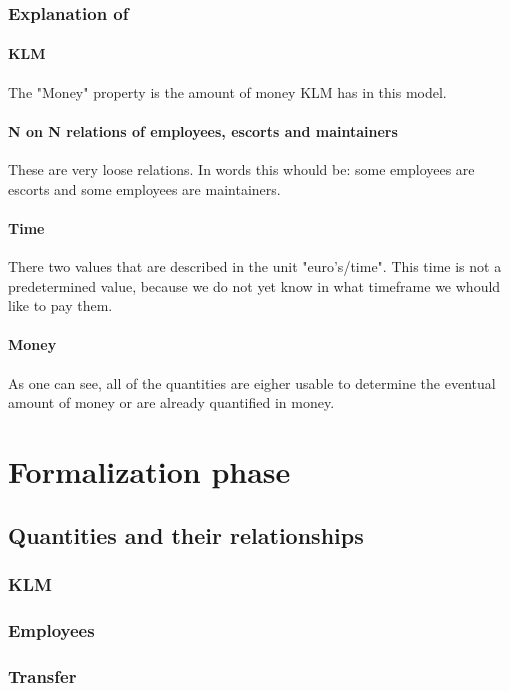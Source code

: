 \documentclass[a4paper, 12pt, notitlepage]{report}
\begin{document}
\subsection{Explanation of}
\subsubsection{KLM}
The "Money" property is the amount of money KLM has in this model. 

\subsubsection{N on N relations of employees, escorts and maintainers}
These are very loose relations. In words this whould be: some employees are escorts and some employees are maintainers. 

\subsubsection{Time}
There two values that are described in the unit "euro's/time". This time is not a predetermined value, because we do not yet know in what timeframe we whould like to pay them. 

\subsubsection{Money}
As one can see, all of the quantities are eigher usable to determine the eventual amount of money or are already quantified in money.

\chapter{Formalization phase}
\section{Quantities and their relationships}

\subsection{KLM}
\subsection{Employees}
\subsection{Transfer}
\end{document}
